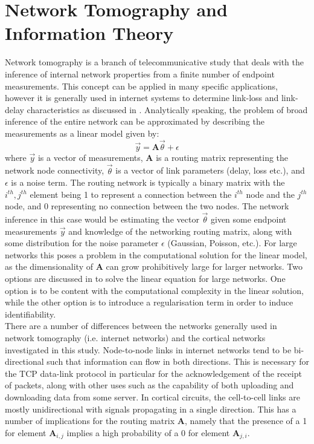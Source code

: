 \documentclass[letterpaper, 10 pt, conference]{ieeeconf}  %
\begin{document}
\section{Network Tomography and Information Theory}
Network tomography is a branch of telecommunicative study that deals with the inference of internal network properties from a finite number of endpoint measurements. This concept can be applied in many specific applications, however it is generally used in internet systems to determine link-loss and link-delay characteristics as discussed in \cite{intTom}. Analytically speaking, the problem of broad inference of the entire network can be approximated by describing the measurements as a linear model \cite{intTom} given by:
\begin{equation}
    \label{generalNetTom}
    \vec{y}=\boldsymbol{A}\vec{\theta}+\epsilon
\end{equation}
where $\vec{y}$ is a vector of measurements, $\boldsymbol{A}$ is a routing matrix representing the network node connectivity, $\vec{\theta}$ is a vector of link parameters (delay, loss etc.), and $\epsilon$ is a noise term. The routing network is typically a binary matrix with the $i^{th},j^{th}$ element being 1 to represent a connection between the $i^{th}$ node and the $j^{th}$ node, and 0 representing no connection between the two nodes. The network inference in this case would be estimating the vector $\vec{\theta}$ given some endpoint measurements $\vec{y}$ and knowledge of the networking routing matrix, along with some distribution for the noise parameter $\epsilon$ (Gaussian, Poisson, etc.). For large networks this poses a problem in the computational solution for the linear model, as the dimensionality of $\boldsymbol{A}$ can grow prohibitively large for larger networks. Two options are discussed in \cite{intTom} to solve the linear equation for large networks. One option is to be content with the computational complexity in the linear solution, while the other option is to introduce a regularisation term in order to induce identifiability.\\
There are a number of differences between the networks generally used in network tomography (i.e. internet networks) and the cortical networks investigated in this study. Node-to-node links in internet networks tend to be bi-directional such that information can flow in both directions. This is necessary for the TCP data-link protocol in particular for the acknowledgement of the receipt of packets, along with other uses such as the capability of both uploading and downloading data from some server. In cortical circuits, the cell-to-cell links are mostly unidirectional with signals propagating in a single direction. This has a number of implications for the routing matrix $\boldsymbol{A}$, namely that the presence of a 1 for element $\boldsymbol{A}_{i,j}$ implies a high probability of a 0 for element $\boldsymbol{A}_{j,i}$.\\
\end{document}
